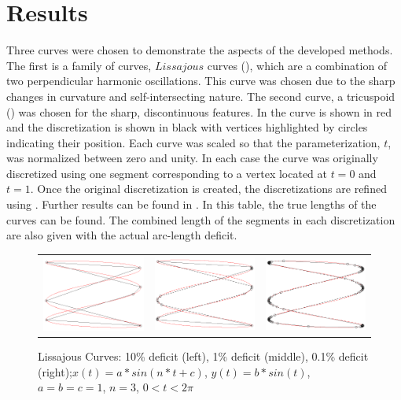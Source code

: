 \section{Results}
Three curves were chosen to demonstrate the aspects of the developed methods. The first is a family of curves, $Lissajous$ curves (), which are a combination of two perpendicular harmonic oscillations. This curve was chosen due to the sharp changes in curvature and self-intersecting nature. The second curve, a tricuspoid () was chosen for the sharp, discontinuous features. In  the curve is shown in red and the discretization is shown in black with vertices highlighted by circles indicating their position. Each curve was scaled so that the parameterization, $t$, was normalized between zero and unity. In each case the curve was originally discretized using one segment corresponding to a vertex located at $t=0$ and $t=1$. Once the original discretization is created, the discretizations are refined using . Further results can be found in . In this table, the true lengths of the curves can be found. The combined length of the segments in each discretization are also given with the actual arc-length deficit.

\begin{figure}[h!]
  \centering
  \begin{tabular}{ccc}
  \includegraphics[width=0.3\linewidth]{Figures/lissajous01.png} &
  \includegraphics[width=0.3\linewidth]{Figures/lissajous001.png} &
  \includegraphics[width=0.3\linewidth]{Figures/lissajous0001.png}
  \end{tabular}
  \caption{\label{fig:lissajous} Lissajous Curves: 10\% deficit (left), 1\% deficit (middle), 0.1\% deficit (right);\newline $x(t) = a * sin(n*t + c)$, $y(t) = b* sin(t)$, $a=b=c=1$, $n=3$, $0 < t < 2\pi$}
\end{figure}

